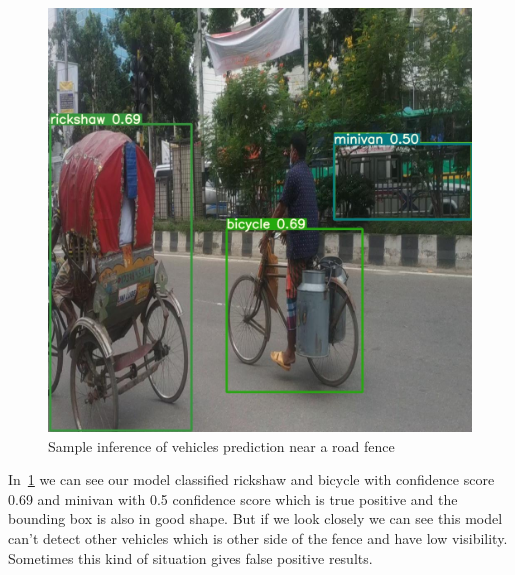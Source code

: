 \begin{figure}[h]
    \centering
    \includegraphics[max width=\textwidth]{images/ours/2.jpg}
   \caption[Sample Inference of Vehicles 1]{Sample inference of vehicles prediction near a road fence}
    \label{fig:inference345}
\end{figure}

\newpage
In~\ref{fig:inference345} we can see our model classified rickshaw and bicycle with confidence score 0.69 and minivan with 0.5 confidence score which is true positive and the bounding box is also in good shape. But if we look closely we can see this model can't detect other vehicles which is other side of the fence and have low visibility. Sometimes this kind of situation gives false positive results. 

